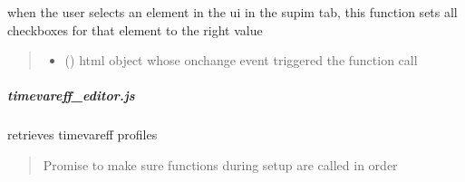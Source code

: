 \documentclass[letterpaper,10pt,english]{sphinxmanual}
\begin{document}
\begin{fulllineitems}
\label{\detokenize{docs_gui/js_api/urbs_editor/supim_editor:fillSelectedFeatureSupimEditor}}
\pysigstartsignatures
{}
\pysigstopsignatures
\sphinxAtStartPar
when the user selects an element in the ui in the supim tab, this function sets all checkboxes for that element to the right value
\begin{quote}\begin{description}
\begin{itemize}
\item {} 
\sphinxAtStartPar
{} () \textendash{} html object whose onchange event triggered the function call

\end{itemize}

\end{description}\end{quote}

\end{fulllineitems}


\sphinxstepscope


\subparagraph{timevareff\_editor.js}
\label{\detokenize{docs_gui/js_api/urbs_editor/timevareff_editor:timevareff-editor-js}}\label{\detokenize{docs_gui/js_api/urbs_editor/timevareff_editor::doc}}

\begin{fulllineitems}
\label{\detokenize{docs_gui/js_api/urbs_editor/timevareff_editor:fetchFeatureProfiles}}
\pysigstartsignatures
{}
\pysigstopsignatures
\sphinxAtStartPar
retrieves timevareff profiles
\begin{quote}\begin{description}
\sphinxAtStartPar
Promise to make sure functions during setup are called in order

\end{description}\end{quote}

\end{fulllineitems}
\end{document}
